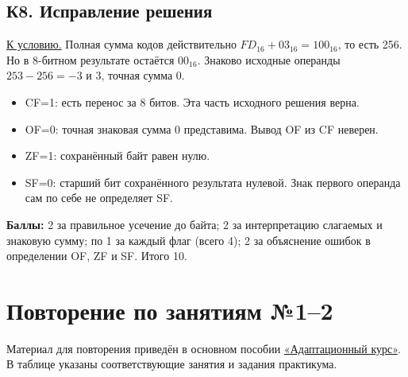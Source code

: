 \subsection*{К8. Исправление решения}\label{sol:k8}
\hyperref[task:k8]{К условию.}
Полная сумма кодов действительно $FD_{16}+03_{16}=100_{16}$, то есть 256. Но в 8-битном результате остаётся $00_{16}$. Знаково исходные операнды $253-256=-3$ и 3, точная сумма 0.

\begin{itemize}
    \item CF=1: есть перенос за 8 битов. Эта часть исходного решения верна.
    \item OF=0: точная знаковая сумма 0 представима. Вывод OF из CF неверен.
    \item ZF=1: сохранённый байт равен нулю.
    \item SF=0: старший бит сохранённого результата нулевой. Знак первого операнда сам по себе не определяет SF.
\end{itemize}
\textbf{Баллы:} 2 за правильное усечение до байта; 2 за интерпретацию слагаемых и знаковую сумму; по 1 за каждый флаг (всего 4); 2 за объяснение ошибок в определении OF, ZF и SF. Итого 10.

\section{Повторение по занятиям №1--2}
Материал для повторения приведён в основном пособии \href{adaptation_course.pdf}{«Адаптационный курс»}. В таблице указаны соответствующие занятия и задания практикума.

